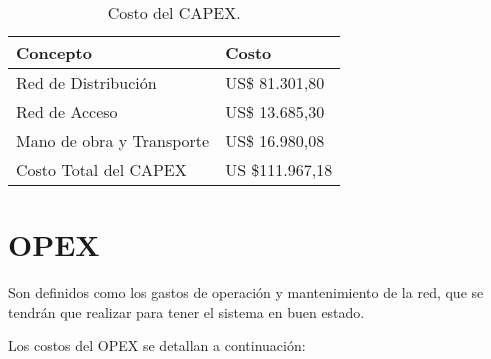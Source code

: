 \begin{table}[H]
\centering
\begin{tabular}{|l|l|}
\hline
\rowcolor[HTML]{C5D9F1}
Concepto                  & Costo          \\ \hline
Red de Distribución       & US\$ 81.301,80   \\ \hline
Red de Acceso             & US\$ 13.685,30 \\ \hline
Mano de obra y Transporte & US\$ 16.980,08     \\ \hline
Costo Total del CAPEX     & US \$111.967,18 \\ \hline
\end{tabular}
  \caption{Costo del CAPEX.}
  \label{tab:capex}
\end{table}






\section{OPEX}

Son definidos como los gastos de operación y mantenimiento de la red, que se tendrán que realizar para tener el sistema en buen estado.

Los costos del OPEX se detallan a continuación:

